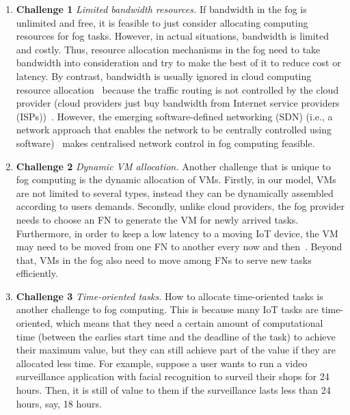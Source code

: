 \documentclass[11pt]{phdthesis}
\begin{document}

\begin{enumerate}
	
	\item \label{itm: Challenge bandwidth} \textbf{Challenge 1} \textit{Limited bandwidth resources.} If bandwidth in the fog is unlimited and free, it is feasible to just consider allocating computing resources for fog tasks. However, in actual situations, bandwidth is limited and costly. Thus, resource allocation mechanisms in the fog need to take bandwidth into consideration and try to make the best of it to reduce cost or latency. By contrast, bandwidth is usually ignored in cloud computing resource allocation~\citep{shi2016online} because the traffic routing is not controlled by the cloud provider (cloud providers just buy bandwidth from Internet service providers (ISPs))~\citep{he2005pricing}. However, the emerging software-defined networking (SDN) (i.e., a network approach that enables the network to be centrally controlled using software)~\citep{kreutz2015software} makes centralised network control in fog computing feasible.
	
	\item \label{itm: Challenge VM} \textbf{Challenge 2} \textit{Dynamic VM allocation.} Another challenge that is unique to fog computing is the dynamic allocation of VMs. Firstly, in our model, VMs are not limited to several types, instead they can be dynamically assembled according to users demands. Secondly, unlike cloud providers, the fog provider needs to choose an FN to generate the VM for newly arrived tasks. Furthermore, in order to keep a low latency to a moving IoT device, the VM may need to be moved from one FN to another every now and then~\citep{bittencourt2015towards}. Beyond that, VMs in the fog also need to move among FNs to serve new tasks efficiently. 
	
	\item \label{itm: Challenge time-oriented} \textbf{Challenge 3} \textit{Time-oriented tasks.} How to allocate time-oriented tasks is another challenge to fog computing. This is because many IoT tasks are time-oriented, which means that they need a certain amount of computational time (between the earlies start time and the deadline of the task) to achieve their maximum value, but they can still achieve part of the value if they are allocated less time. For example, suppose a user wants to run a video surveillance application with facial recognition to surveil their shops for 24 hours. Then, it is still of value to them if the surveillance lasts less than 24 hours, say, 18 hours.
	

\end{enumerate}
\end{document}
